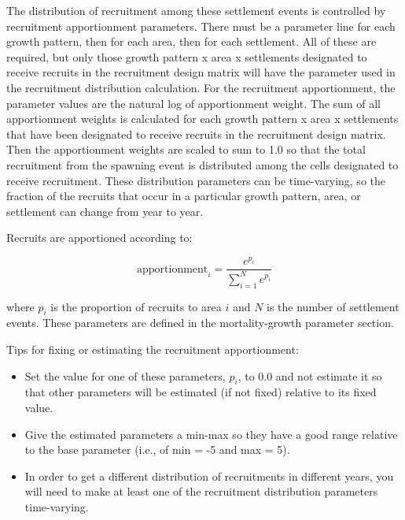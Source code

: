 The distribution of recruitment among these settlement events is controlled by recruitment apportionment parameters. There must be a parameter line for each growth pattern, then for each area, then for each settlement. All of these are required, but only those growth pattern x area x settlements designated to receive recruits in the recruitment design matrix will have the parameter used in the recruitment distribution calculation. For the recruitment apportionment, the parameter values are the natural log of apportionment weight. The sum of all apportionment weights is calculated for each growth pattern x area x settlements that have been designated to receive recruits in the recruitment design matrix. Then the apportionment weights are scaled to sum to 1.0 so that the total recruitment from the spawning event is distributed among the cells designated to receive recruitment. These distribution parameters can be time-varying, so the fraction of the recruits that occur in a particular growth pattern, area, or settlement can change from year to year. 

\hypertarget{recdist}{}
Recruits are apportioned according to:

\begin{equation}
	\text{apportionment}_i = \frac{e^{p_i}}{\sum_{i=1}^{N}e^{p_i}}
\end{equation}

where $p_i$ is the proportion of recruits to area $i$ and $N$ is the number of settlement events.  These parameters are defined in the mortality-growth parameter section.  

Tips for fixing or estimating the recruitment apportionment:
\begin{itemize}
	
	\item Set the value for one of these parameters, $p_i$, to 0.0 and not estimate it so that other parameters will be estimated (if not fixed) relative to its fixed value.
	
	\item Give the estimated parameters a min-max so they have a good range relative to the base parameter (i.e., of min = -5 and max = 5).
	
	\item In order to get a different distribution of recruitments in different years, you will need to make at least one of the recruitment distribution parameters time-varying.

\end{itemize}	

